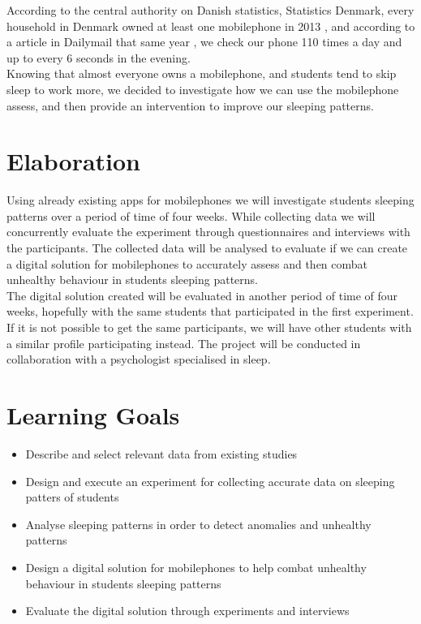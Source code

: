 \documentclass[12pt]{article}
\begin{document}
According to the central authority on Danish statistics, Statistics Denmark, every household in 
Denmark owned at least one mobilephone in 2013 \cite{DanmarksStatistik2013}, and according 
to a article in Dailymail that same year \cite{Woollaston2013}, we check our phone 110 times a 
day and up to every 6 seconds in the evening. \\

Knowing that almost everyone owns a mobilephone, and students tend to skip sleep to work more,
we decided to investigate how we can use the mobilephone assess, and then provide an intervention to 
improve our sleeping patterns. 

\section{Elaboration}
Using already existing apps for mobilephones we will investigate students sleeping patterns over a 
period of time of four weeks. While collecting data we will concurrently evaluate the experiment through 
questionnaires and interviews with the participants. The collected data will be analysed to evaluate if we
can create a digital solution for mobilephones to accurately assess and then combat unhealthy behaviour 
in students sleeping patterns. \\

The digital solution created will be evaluated in another period of time of four weeks, hopefully with 
the same students that participated in the first experiment. If it is not possible to get the same 
participants, we will have other students with a similar profile participating instead. The project will be 
conducted in collaboration with a psychologist specialised in sleep. 

\section{Learning Goals}
	\begin{itemize}
		\item Describe and select relevant data from existing studies
		\item Design and execute an experiment for collecting accurate data on sleeping patters of students
		\item Analyse sleeping patterns in order to detect anomalies and unhealthy patterns 
		\item Design a digital solution for mobilephones to help combat unhealthy behaviour in students sleeping patterns
		\item Evaluate the digital solution through experiments and interviews
	\end{itemize}
	
\end{document}
